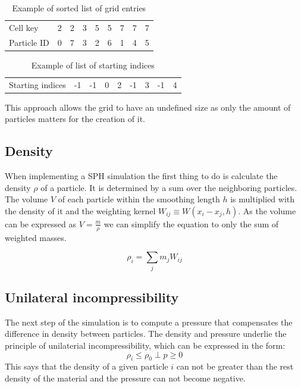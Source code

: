 \documentclass[intern]{cgMA}
\begin{document}
    \begin{table}[ht]
        \centering
        \caption{Example of sorted list of grid entries }
        \begin{tabular}{ l c c c c c c c c }
            Cell key    & 2 & 2 & 3 & 5 & 5 & 7 & 7 & 7 \\ 
            Particle ID & 0 & 7 & 3 & 2 & 6 & 1 & 4 & 5 \\   
        \end{tabular}
    \end{table}

    \begin{table}[ht]
        \centering
        \caption{Example of list of starting indices }
        \begin{tabular}{ l c c c c c c c c }
            Starting indices    & -1 & -1 & 0 & 2 & -1 & 3 & -1 & 4 \\ 
        \end{tabular}
    \end{table}

    This approach allows the grid to have an undefined size as only the amount of particles matters for the creation of it. 

    \subsection{Density}  
    When implementing a SPH simulation the first thing to do is calculate the density $\rho$ of a particle. It is determined by a sum over the neighboring particles. The volume $V$ of each particle within the smoothing length $h$ is multiplied with the density of it and the weighting kernel $ W_{ij} \equiv W(x_i - x_j, h)$. As the volume can be expressed as $V = \frac{m}{\rho}$ we can simplify the equation to only the sum of weighted masses. \cite{wcsph}

    \begin{equation}
        \rho_i = \sum_j m_j W_{ij}
    \end{equation}

    \subsection{Unilateral incompressibility}  
    The next step of the simulation is to compute a pressure that compensates the difference in density between particles. The density and pressure underlie the principle of unilaterial incompressibility, which can be expressed in the form: 
    \begin{equation}
        \rho_i \leq \rho_0 \; \bot \;  p \geq 0
    \end{equation}
    This says that the density of a given particle $i$ can not be greater than the rest density of the material and the pressure can not become negative. \cite{10.1145/2019406.2019410}
\end{document}
